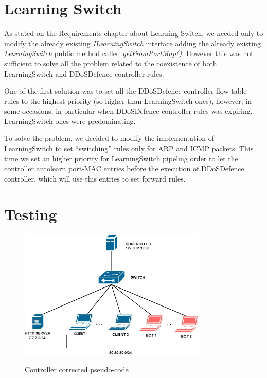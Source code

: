 \chapter{Learning Switch}
As stated on the Requirements chapter about Learning Switch, we needed only to modify the already existing \textit{ILearningSwitch} interface adding the already existing \textit{LearningSwitch} public method called \textit{getFromPortMap()}. However this was not sufficient to solve all the problem related to the coexistence of both LearningSwitch and DDoSDefence controller rules.

One of the first solution was to set all the DDoSDefence controller flow table rules to the highest priority (so higher than LearningSwitch ones), however, in some occasions, in particular when DDoSDefence controller rules was expiring, LearningSwitch ones were predominating.

To solve the problem, we decided to modify the implementation of LearningSwitch to set ``switching'' rules only for ARP and ICMP packets. This time we set an higher priority for LearningSwitch pipeling order to let the controller autolearn port-MAC entries before the execution of DDoSDefence controller, which will use this entries to set forward rules.

\chapter{Testing}
\begin{figure}[H]
\begin{center}
\includegraphics[width=0.8\textwidth]{images/TestingTopology_new.jpg}
\label{fig:pseudocode}
\caption{Controller corrected pseudo-code}
\end{center}
\end{figure}

